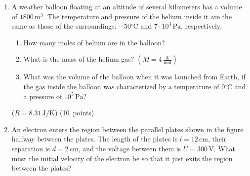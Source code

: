 \documentclass[12pt]{letter}
\begin{document}
\begin{enumerate}

\bigskip
\item A weather balloon floating at an altitude of several kilometers has a volume of $1800\,\mathrm{m}^{3}$. The temperature and pressure of the helium inside it are the same as those of the surroundings: $-50{}^{\circ}\mathrm{C}$ and $7 \cdot 10^{3}\,\mathrm{Pa}$, respectively.
\begin{enumerate}
\item How many moles of helium are in the balloon?
\item What is the mass of the helium gas? $\left(M = 4\,\frac{\mathrm{g}}{\mathrm{mol}}\right)$
\item What was the volume of the balloon when it was launched from Earth, if the gas inside the balloon was characterized by a temperature of $0{}^{\circ}\mathrm{C}$ and a pressure of $10^{5}\,\mathrm{Pa}$?
\end{enumerate}
($R=8.31\,\mathrm{J/K}$) \hfill (10~points)


\bigskip
\item An electron enters the region between the parallel plates shown in the figure halfway between the plates. The length of the plates is $l = 12\,\mathrm{cm}$, their separation is $d = 2\,\mathrm{cm}$, and the voltage between them is $U = 300\,\mathrm{V}$. What must the initial velocity of the electron be so that it just exits the region between the plates? 
  
\begin{center}
\end{center}
\end{enumerate}
\end{document}
